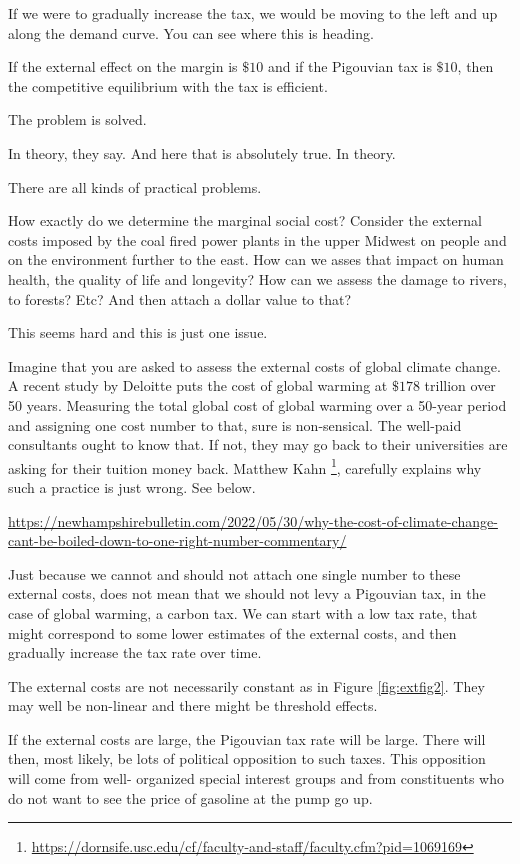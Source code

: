 \documentclass[
]{book}
\begin{document}
If we were to gradually increase the tax, we would be moving to the left and up along the demand curve. You can see where this is heading.

If the external effect on the margin is \(\$10\) and if the Pigouvian tax is \(\$10\), then the competitive equilibrium with the tax is efficient.

The problem is solved.

In theory, they say. And here that is absolutely true. In theory.

There are all kinds of practical problems.

How exactly do we determine the marginal social cost? Consider the external costs imposed by the coal fired power plants in the upper Midwest on people and on the environment further to the east. How can we asses that impact on human health, the quality of life and longevity? How can we assess the damage to rivers, to forests? Etc? And then attach a dollar value to that?

This seems hard and this is just one issue.

Imagine that you are asked to assess the external costs of global climate change. A recent study by Deloitte puts the cost of global warming at \(\$178\) trillion over 50 years. Measuring the total global cost of global warming over a 50-year period and assigning one cost number to that, sure is non-sensical. The well-paid consultants ought to know that. If not, they may go back to their universities are asking for their tuition money back. Matthew Kahn \footnote{\url{https://dornsife.usc.edu/cf/faculty-and-staff/faculty.cfm?pid=1069169}}, carefully explains why such a practice is just wrong. See below.

\url{https://newhampshirebulletin.com/2022/05/30/why-the-cost-of-climate-change-cant-be-boiled-down-to-one-right-number-commentary/}

Just because we cannot and should not attach one single number to these external costs, does not mean that we should not levy a Pigouvian tax, in the case of global warming, a carbon tax. We can start with a low tax rate, that might correspond to some lower estimates of the external costs, and then gradually increase the tax rate over time.

The external costs are not necessarily constant as in Figure \ref{fig:extfig2}. They may well be non-linear and there might be threshold effects.

If the external costs are large, the Pigouvian tax rate will be large. There will then, most likely, be lots of political opposition to such taxes. This opposition will come from well- organized special interest groups and from constituents who do not want to see the price of gasoline at the pump go up.
\end{document}
